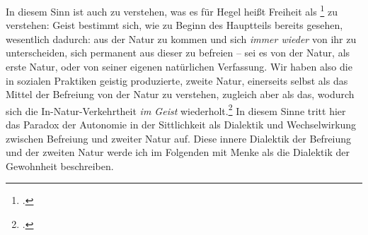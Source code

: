 \documentclass[12pt, a4paper, openany]{report}
\begin{document}
In diesem Sinn ist auch zu verstehen, was es für Hegel heißt Freiheit als \footcite[][§194, S. 197.]{hegel_grundlinien_2017} zu verstehen: 
Geist bestimmt sich, wie zu Beginn des Hauptteils bereits gesehen, wesentlich dadurch: 
aus der Natur zu kommen und sich \emph{immer wieder} von ihr zu unterscheiden, sich permanent aus dieser zu befreien -- sei es von der Natur, als erste Natur, oder von seiner eigenen natürlichen Verfassung.
Wir haben also die in sozialen Praktiken geistig produzierte, zweite Natur, einerseits selbst als das Mittel der Befreiung von der Natur zu verstehen, zugleich aber als das, wodurch sich die In-Natur-Verkehrtheit \emph{im Geist} wiederholt.\footcite[Vgl.][41]{menke_autonomie_2018}
In diesem Sinne tritt hier das Paradox der Autonomie in der Sittlichkeit als Dialektik und Wechselwirkung zwischen Befreiung und zweiter Natur auf.
Diese innere Dialektik der Befreiung und der zweiten Natur werde ich im Folgenden mit Menke als die Dialektik der Gewohnheit beschreiben.
\end{document}
